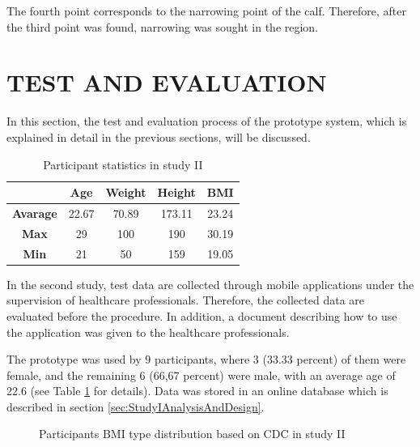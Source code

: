 The fourth point corresponds to the narrowing point of the calf. Therefore, after the third point was found, narrowing was sought in the region.

\section{TEST AND EVALUATION}\label{sec:StudyIITestAndEvaluation}

In this section, the test and evaluation process of the prototype system, which is explained in detail in the previous sections, will be discussed.

\begin{table}[htbp]
\begin{center}
\caption{Participant statistics in study II}
      \begin{tabular}{|c|c|c|c|c|} \hline
          & \textbf{Age} & \textbf{Weight} & \textbf{Height} & \textbf{BMI} \\ \hline
        \textbf{Avarage} & 22.67 & 70.89 & 173.11 & 23.24 \\ \hline
        \textbf{Max} & 29 & 100 & 190 & 30.19 \\ \hline
        \textbf{Min} & 21 & 50 & 159 & 19.05 \\ \hline
    \end{tabular}
\label{tab:StudyIIParticipantStatistics}
\end{center}
\end{table}

In the second study, test data are collected through mobile applications under the supervision of healthcare professionals. Therefore, the collected data are evaluated before the procedure. In addition, a document describing how to use the application was given to the healthcare professionals.

The prototype was used by 9 participants, where 3 (33.33 percent) of them were female, and the remaining 6 (66,67 percent) were male, with an average age of 22.6 (see Table \ref{tab:StudyIIParticipantStatistics} for details). Data was stored in an online database which is described in section \ref{sec:StudyIAnalysisAndDesign}.

\begin{figure}[htbp]
\centering
{}
\caption{Participants BMI type distribution based on CDC in study II}
\label{fig:StudyIIParticipantsBMITypeDistribution}
\end{figure}

